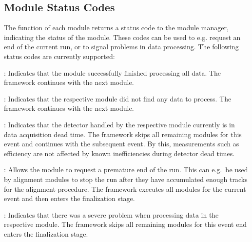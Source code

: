 \subsection{Module Status Codes}

The  function of each module returns a status code to the module manager, indicating the status of the module.
These codes can be used to e.g. request an end of the current run, or to signal problems in data processing.
The following status codes are currently supported:

\begin{description}
    \item{}: Indicates that the module successfully finished processing all data. The framework continues with the next module.
    \item{}: Indicates that the respective module did not find any data to process. The framework continues with the next module.
    \item{}: Indicates that the detector handled by the respective module currently is in data acquisition dead time. The framework skips all remaining modules for this event and continues with the subsequent event. By this, measurements such as efficiency are not affected by known inefficiencies during detector dead times.
    \item{}: Allows the module to request a premature end of the run. This can e.g.\ be used by alignment modules to stop the run after they have accumulated enough tracks for the alignment procedure. The framework executes all modules for the current event and then enters the finalization stage.
    \item{}: Indicates that there was a severe problem when processing data in the respective module. The framework skips all remaining modules for this event end enters the finalization stage.
\end{description}


